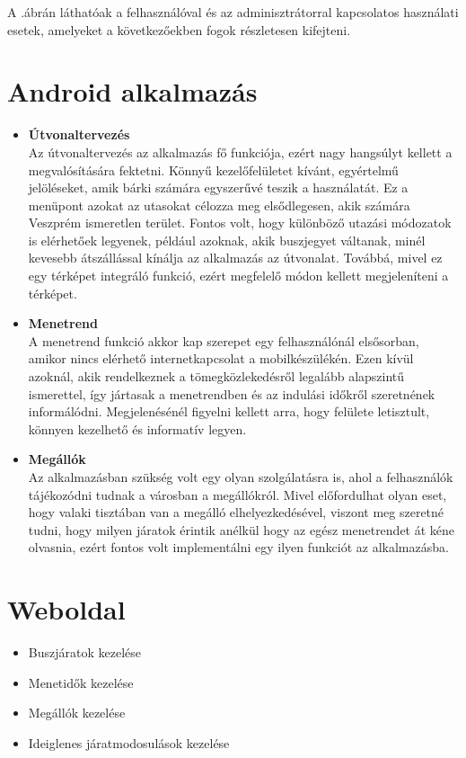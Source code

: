 A .ábrán láthatóak a felhasználóval és az adminisztrátorral kapcsolatos használati esetek, amelyeket a következőekben fogok részletesen kifejteni.

\section*{Android alkalmazás}
\begin{itemize}
	\item \textbf{Útvonaltervezés}
	\\
	Az útvonaltervezés az alkalmazás fő funkciója, ezért nagy hangsúlyt kellett a megvalósítására fektetni. 
	Könnyű kezelőfelületet kívánt, egyértelmű jelöléseket, amik bárki számára egyszerűvé teszik a használatát. 
	Ez a menüpont azokat az utasokat célozza meg elsődlegesen, akik számára Veszprém ismeretlen terület. 
	Fontos volt, hogy különböző utazási módozatok is elérhetőek legyenek, például azoknak, akik buszjegyet váltanak, minél kevesebb átszállással kínálja az alkalmazás az útvonalat. 
	Továbbá, mivel ez egy térképet integráló funkció, ezért megfelelő módon kellett megjeleníteni a térképet. 	
	\item \textbf{Menetrend}
	\\
	A menetrend funkció akkor kap szerepet egy felhasználónál elsősorban, amikor nincs elérhető internetkapcsolat a mobilkészülékén. 
	Ezen kívül azoknál, akik rendelkeznek a tömegközlekedésről legalább alapszintű ismerettel, így jártasak a menetrendben és az indulási időkről szeretnének informálódni. 
	Megjelenésénél figyelni kellett arra, hogy felülete letisztult, könnyen kezelhető és informatív legyen.
	\item \textbf{Megállók}
	\\
	Az alkalmazásban szükség volt egy olyan szolgálatásra is, ahol a felhasználók tájékozódni tudnak a városban a megállókról. 
	Mivel előfordulhat olyan eset, hogy valaki tisztában van a megálló elhelyezkedésével, viszont meg szeretné tudni, hogy milyen járatok érintik anélkül hogy az egész menetrendet át kéne olvasnia, ezért fontos volt implementálni egy ilyen funkciót az alkalmazásba. 
\end{itemize}
\section*{Weboldal}
\begin{itemize}
	\item Buszjáratok kezelése
	\item Menetidők kezelése
	\item Megállók kezelése
	\item Ideiglenes járatmodosulások kezelése
\end{itemize}
	
